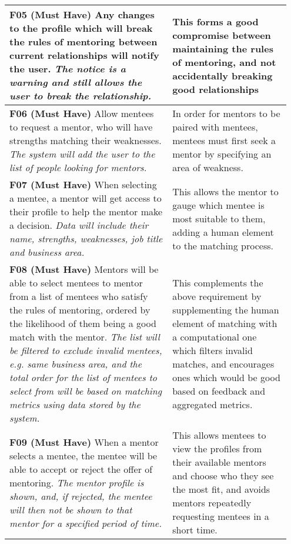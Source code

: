 \documentclass[10pt]{article}
\begin{document}
\begin{longtable}{|p{0.55\linewidth}|p{0.4\linewidth}|}
    \textbf{F05 (Must Have) }
    Any changes to the profile which will break the rules of mentoring between
    current relationships will notify the user.
    \textit{The notice is a warning and still allows the user to break the
    relationship.}
        &
    This forms a good compromise between maintaining the rules of mentoring,
    and not accidentally breaking good relationships
    \\ \hline

    \textbf{F06 (Must Have) }
    Allow mentees to request a mentor, who will have strengths matching their
    weaknesses.
    \textit{The system will add the user to the list of people looking for
    mentors.}
        &
    In order for mentors to be paired with mentees, mentees must first seek a
    mentor by specifying an area of weakness.
    \\ \hline

    \textbf{F07 (Must Have) }
    When selecting a mentee, a mentor will get access to their profile to help
    the mentor make a decision.
    \textit{Data will include their name, strengths, weaknesses, job title and
    business area.}
        &
    This allows the mentor to gauge which mentee is most suitable to them,
    adding a human element to the matching process.
    \\ \hline

    \textbf{F08 (Must Have) }
    Mentors will be able to select mentees to mentor from a list of mentees who
    satisfy the rules of mentoring, ordered by the likelihood of them being a
    good match with the mentor.
    \textit{The list will be filtered to exclude invalid mentees, e.g. same
    business area, and the total order for the list of mentees to select from
    will be based on matching metrics using data stored by the system.}             %
        &
    This complements the above requirement by supplementing the human element of
    matching with a computational one which filters invalid matches, and
    encourages ones which would be good based on feedback and aggregated
    metrics.
    \\ \hline

    \textbf{F09 (Must Have) }
    When a mentor selects a mentee, the mentee will be able to accept or reject
    the offer of mentoring.
    \textit{The mentor profile is shown, and, if rejected, the mentee will then
    not be shown to that mentor for a specified period of time.}
        &
    This allows mentees to view the profiles from their available mentors and
    choose who they see the most fit, and avoids mentors repeatedly requesting
    mentees in a short time.
    \\ \hline


\end{longtable}
\end{document}
